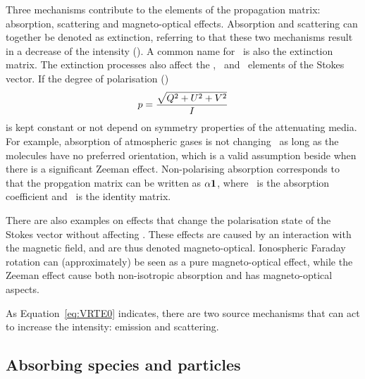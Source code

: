 Three mechanisms contribute to the elements of the propagation matrix:
absorption, scattering and magneto-optical effects. Absorption and scattering
can together be denoted as extinction, referring to that these two mechanisms
result in a decrease of the intensity (\StoI). A common name for \ExtMat\ is
also the extinction matrix. The extinction processes also affect the \StoQ,
\StoU\ and \StoV\ elements of the Stokes vector. If the degree of polarisation
(\DgrPlr)
\begin{equation}
  \label{eq:degreeofpol}
  p = \frac{\sqrt{Q^2+U^2+V^2}}{I}
\end{equation}
is kept constant or not depend on symmetry properties of the attenuating media.
For example, absorption of atmospheric gases is not changing \DgrPlr\ as long
as the molecules have no preferred orientation, which is a valid assumption
beside when there is a significant Zeeman effect. Non-polarising absorption
corresponds to that the propgation matrix can be written as ${\alpha}\mathbf{1}$,
where \AbsCoef\ is the absorption coefficient and \IdnMtr\ is the identity
matrix.

There are also examples on effects that change the polarisation state of the
Stokes vector without affecting \StoI. These effects are caused by an
interaction with the magnetic field, and are thus denoted magneto-optical.
Ionospheric Faraday rotation can (approximately) be seen as a pure
magneto-optical effect, while the Zeeman effect cause both non-isotropic
absorption and has magneto-optical aspects.

As Equation~\ref{eq:VRTE0} indicates, there are two source mechanisms that can
act to increase the intensity: emission and scattering.


\subsection{Absorbing species and particles}
\label{sec:rteq:absspecies}

